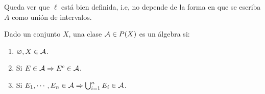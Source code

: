 \begin{note}
    Queda ver que $\ell$ está bien definida, i.e, no depende de la forma en que se escriba $A$ como unión de intervalos.
\end{note}

\begin{definition}[Álgebra]
    Dado un conjunto $X$, una clase $\mathcal{A} \in P(X)$ es un álgebra si: \begin{enumerate}
        \item $\varnothing, X \in \mathcal{A}$.
        \item Si $E \in \mathcal{A} \Rightarrow E^c \in \mathcal{A}$.
        \item Si $E_1, \cdots, E_n \in \mathcal{A} \Rightarrow \bigcup_{i = 1}^n E_i \in \mathcal{A}$.
    \end{enumerate}
\end{definition}

